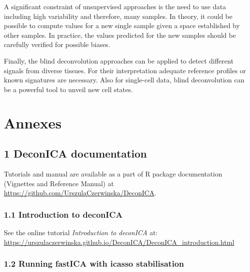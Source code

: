 \documentclass[12pt,]{book}
\theoremstyle{definition}
\theoremstyle{definition}
\theoremstyle{definition}
\theoremstyle{remark}
\begin{document}
A significant constraint of unsupervised approaches is the need to use
data including high variability and therefore, many samples. In theory,
it could be possible to compute values for a new single sample given a
space established by other samples. In practice, the values predicted
for the new samples should be carefully verified for possible biases.

Finally, the blind deconvolution approaches can be applied to detect
different signals from diverse tissues. For their interpretation
adequate reference profiles or known signatures are necessary. Also for
single-cell data, blind deconvolution can be a powerful tool to unveil
new cell states.

\hypertarget{annexes}{%
\chapter*{Annexes}\label{annexes}}


\hypertarget{deconica-documentation}{%
\section*{1 DeconICA documentation}\label{deconica-documentation}}

Tutorials and manual are available as a part of R package documentation
(Vignettes and Reference Manual) at
\url{https://github.com/UrszulaCzerwinska/DeconICA}.

\hypertarget{introduction-to-deconica}{%
\subsection*{1.1 Introduction to
deconICA}\label{introduction-to-deconica}}

See the online tutorial \emph{Introduction to deconICA} at:
\url{https://urszulaczerwinska.github.io/DeconICA/DeconICA_introduction.html}


\newpage

\hypertarget{running-fastica-with-icasso-stabilisation}{%
\subsection*{1.2 Running fastICA with icasso
stabilisation}\label{running-fastica-with-icasso-stabilisation}}
\end{document}
